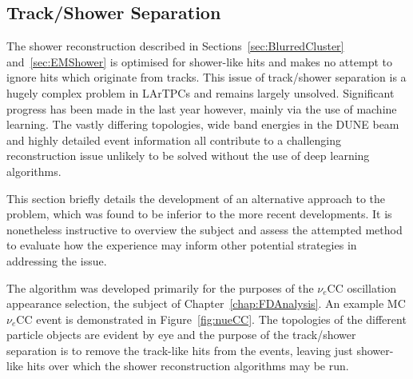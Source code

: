 \subsection{Track/Shower Separation}\label{sec:TrackShowerSeparation}

The shower reconstruction described in Sections~\ref{sec:BlurredCluster} and~\ref{sec:EMShower} is optimised for shower-like hits and makes no attempt to ignore hits which originate from tracks.  This issue of track/shower separation is a hugely complex problem in LArTPCs and remains largely unsolved.  Significant progress has been made in the last year however, mainly via the use of machine learning.  The vastly differing topologies, wide band energies in the DUNE beam and highly detailed event information all contribute to a challenging reconstruction issue unlikely to be solved without the use of deep learning algorithms.

This section briefly details the development of an alternative approach to the problem, which was found to be inferior to the more recent developments.  It is nonetheless instructive to overview the subject and assess the attempted method to evaluate how the experience may inform other potential strategies in addressing the issue.

The algorithm was developed primarily for the purposes of the $\nu_e$CC oscillation appearance selection, the subject of Chapter~\ref{chap:FDAnalysis}.  An example MC $\nu_e$CC event is demonstrated in Figure~\ref{fig:nueCC}.  The topologies of the different particle objects are evident by eye and the purpose of the track/shower separation is to remove the track-like hits from the events, leaving just shower-like hits over which the shower reconstruction algorithms may be run.

